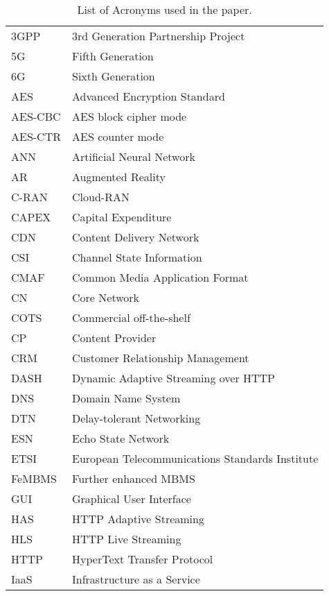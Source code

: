 \begin{longtable}{p{}p{}}
	\caption{List of Acronyms used in the paper.}
		\label{tab:IEEECOMSTacronyms}\\
	\hline
	3GPP & 3rd Generation Partnership Project \\
	5G & Fifth Generation \\
	6G & Sixth Generation \\
	AES & Advanced Encryption Standard \\
	AES-CBC & AES block cipher mode \\
	AES-CTR & AES counter mode \\
	ANN & Artificial Neural Network \\
	AR & Augmented Reality \\
	C-RAN & Cloud-RAN \\
	CAPEX & Capital Expenditure \\
	CDN & Content Delivery Network \\
	CSI & Channel State Information \\
	CMAF & Common Media Application Format \\
	CN & Core Network \\
	COTS & Commercial off-the-shelf \\
	CP & Content Provider \\
	CRM & Customer Relationship Management \\
	DASH & Dynamic Adaptive Streaming over HTTP \\
	DNS & Domain Name System \\
	DTN & Delay-tolerant Networking \\
	ESN & Echo State Network \\
	ETSI & European Telecommunications Standards Institute \\
	FeMBMS & Further enhanced MBMS \\
	GUI & Graphical User Interface \\
	HAS & HTTP Adaptive Streaming \\
	HLS & HTTP Live Streaming \\
	HTTP & HyperText Transfer Protocol \\
	IaaS & Infrastructure as a Service \\

\end{longtable}
